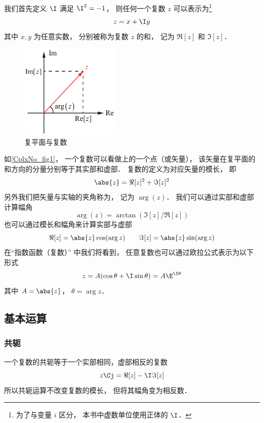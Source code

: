 
我们首先定义 $\I$ 满足 $\I^2 = -1$， 则任何一个复数 $z$ 可以表示为\footnote{为了与变量 $i$ 区分， 本书中虚数单位使用正体的 $\I$．}
\begin{equation}
z = x + \I y
\end{equation}
其中 $x,y$ 为任意实数， 分别被称为复数 $z$ 的和， 记为 $\Re[z]$ 和 $\Im[z]$．

\begin{figure}[ht]
\centering
\includegraphics[width=4.7cm]{./figures/CplxNo1.pdf}
\caption{复平面与复数} \label{CplxNo_fig1}
\end{figure}

如\autoref{CplxNo_fig1}， 一个复数可以看做上的一个点（或矢量）， 该矢量在复平面的和方向的分量分别等于其实部和虚部． 复数的定义为对应矢量的模长， 即
\begin{equation}
\abs{z} = \Re[z]^2 + \Im[z]^2
\end{equation}
另外我们把矢量与实轴的夹角称为， 记为 $\arg(z)$． 我们可以通过实部和虚部计算幅角%
\begin{equation}
\arg(z) = \arctan(\Im[z]/\Re[z])
\end{equation}
也可以通过模长和幅角来计算实部与虚部
\begin{equation}
\Re[z] = \abs{z}\cos(\arg z) \qquad \Im[z] = \abs{z}\sin(\arg z)
\end{equation}
在“指数函数（复数）” 中我们将看到， 任意复数也可以通过欧拉公式表示为以下形式
\begin{equation}
z = A(\cos\theta + \I\sin\theta) = A\E^{\I\theta}
\end{equation}
其中 $A = \abs{z}$， $\theta = \arg z$．

\subsection{基本运算}
\subsubsection{共轭}
一个复数的共轭等于一个实部相同，虚部相反的复数
\begin{equation}\label{CplxNo_eq6}
z\Cj = \Re[z] - \I \Im[z]
\end{equation}
所以共轭运算不改变复数的模长， 但将其幅角变为相反数．

